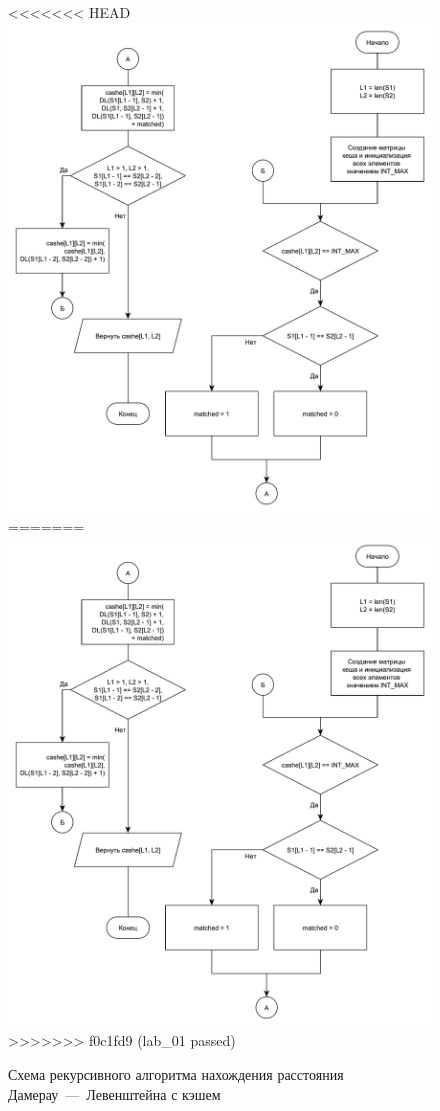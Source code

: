 \begin{figure}[h]
	\centering
<<<<<<< HEAD
	\includegraphics[scale=0.55]{images/dlev_req_cache.pdf}
=======
	\includegraphics[scale=0.6]{images/dlev_req_cache.pdf}
>>>>>>> f0c1fd9 (lab_01 passed)
	\caption{Схема рекурсивного алгоритма нахождения расстояния Дамерау~---~Левенштейна с кэшем}
	\label{img:dlev_req_cache}
\end{figure}

